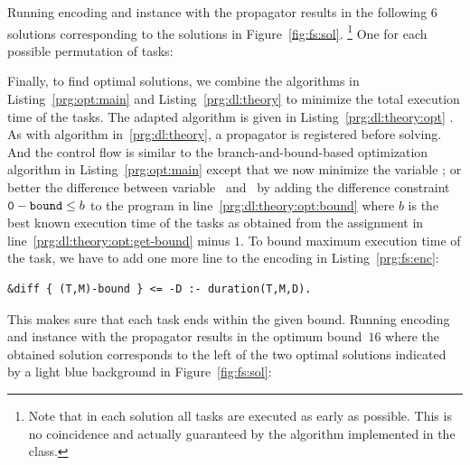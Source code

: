 Running encoding and instance with the  propagator results in the following $6$ solutions
corresponding to the solutions in Figure~\ref{fig:fs:sol}.%
\footnote{Note that in each solution all tasks are executed as early as possible.
  This is no coincidence and actually guaranteed by the algorithm implemented in the  class.}
One for each possible permutation of tasks:
%



%
Finally, to find optimal solutions,
we combine the algorithms in Listing~\ref{prg:opt:main} and Listing~\ref{prg:dl:theory} to minimize the total execution time of the tasks.
The adapted algorithm is given in Listing~\ref{prg:dl:theory:opt} .
%
As with algorithm in~\ref{prg:dl:theory}, a propagator is registered before solving.
And the control flow is similar to the branch-and-bound-based optimization algorithm in Listing~\ref{prg:opt:main}
except that we now minimize the variable ;
or better the difference between variable~ and~
by adding the difference constraint $\texttt{0} - \texttt{bound} \leq b$ to the program in line~\ref{prg:dl:theory:opt:bound}
where $b$ is the best known execution time of the tasks as obtained from the assignment in line~\ref{prg:dl:theory:opt:get-bound} minus $1$.
To bound maximum execution time of the task,
we have to add one more line to the encoding in Listing~\ref{prg:fs:enc}:
\begin{lstlisting}[language=clingo,firstnumber=22]
  &diff { (T,M)-bound } <= -D :- duration(T,M,D).
\end{lstlisting}
This makes sure that each task ends within the given bound.
Running encoding and instance with the  propagator results in the optimum bound~$16$ where
the obtained solution corresponds to the left of the two optimal solutions indicated by a light blue background in Figure~\ref{fig:fs:sol}:


